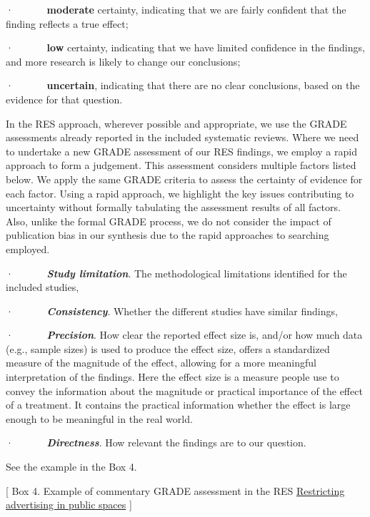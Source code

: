 \documentclass[
  letterpaper,
  DIV=11,
  numbers=noendperiod]{scrreprt}
\begin{document}
·~~~~~~ \textbf{moderate} certainty, indicating that we are fairly
confident that the finding reflects a true effect;

·~~~~~~ \textbf{low} certainty, indicating that we have limited
confidence in the findings, and more research is likely to change our
conclusions;

·~~~~~~ \textbf{uncertain}, indicating that there are no clear
conclusions, based on the evidence for that question.

In the RES approach, wherever possible and appropriate, we use the GRADE
assessments already reported in the included systematic reviews. Where
we need to undertake a new GRADE assessment of our RES findings, we
employ a rapid approach to form a judgement. This assessment considers
multiple factors listed below. We apply the same GRADE criteria to
assess the certainty of evidence for each factor. Using a rapid
approach, we highlight the key issues contributing to uncertainty
without formally tabulating the assessment results of all factors. Also,
unlike the formal GRADE process, we do not consider the impact of
publication bias in our synthesis due to the rapid approaches to
searching employed.

·~~~~~~ \textbf{\emph{Study limitation}}. The methodological limitations
identified for the included studies,

·~~~~~~ \textbf{\emph{Consistency}}. Whether the different studies have
similar findings,

·~~~~~~ \textbf{\emph{Precision}}. How clear the reported effect size
is, and/or how much data (e.g., sample sizes) is used to produce the
effect size, offers a standardized measure of the magnitude of the
effect, allowing for a more meaningful interpretation of the findings.
Here the effect size is a measure people use to convey the information
about the magnitude or practical importance of the effect of a
treatment. It contains the practical information whether the effect is
large enough to be meaningful in the real world.

·~~~~~~ \textbf{\emph{Directness}}. How relevant the findings are to our
question.

See the example in the Box 4.

{[} Box 4. Example of commentary GRADE assessment in the RES
\href{https://arc-gm.nihr.ac.uk/media/Resources/ARC/Evaluation/RES/Implementing\%20policies\%20that\%20restrict\%20the\%20use\%20of\%20outdoor\%20spaces\%20for\%20advertising\%20harmful\%20commodities/ARC-GM\%20RES\%20outdoor\%20advertising\%20harmful\%20commodities\%20revised.pdf}{Restricting
advertising in public spaces} {]}
\end{document}
